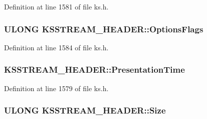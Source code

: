 Definition at line 1581 of file ks.\+h.

\subsubsection[{\texorpdfstring{Options\+Flags}{OptionsFlags}}]{\setlength{\rightskip}{0pt plus 5cm}U\+L\+O\+NG K\+S\+S\+T\+R\+E\+A\+M\+\_\+\+H\+E\+A\+D\+E\+R\+::\+Options\+Flags}\hypertarget{struct_k_s_s_t_r_e_a_m___h_e_a_d_e_r_aa3c01e08df2301bcc31960826d9bf80f}{}\label{struct_k_s_s_t_r_e_a_m___h_e_a_d_e_r_aa3c01e08df2301bcc31960826d9bf80f}


Definition at line 1584 of file ks.\+h.

\subsubsection[{\texorpdfstring{Presentation\+Time}{PresentationTime}}]{ K\+S\+S\+T\+R\+E\+A\+M\+\_\+\+H\+E\+A\+D\+E\+R\+::\+Presentation\+Time}\hypertarget{struct_k_s_s_t_r_e_a_m___h_e_a_d_e_r_a5900b2557203944a2ba94ac03eb6e1f0}{}\label{struct_k_s_s_t_r_e_a_m___h_e_a_d_e_r_a5900b2557203944a2ba94ac03eb6e1f0}


Definition at line 1579 of file ks.\+h.

\subsubsection[{\texorpdfstring{Size}{Size}}]{\setlength{\rightskip}{0pt plus 5cm}U\+L\+O\+NG K\+S\+S\+T\+R\+E\+A\+M\+\_\+\+H\+E\+A\+D\+E\+R\+::\+Size}\hypertarget{struct_k_s_s_t_r_e_a_m___h_e_a_d_e_r_a2763cce2aed94a0c37e6630595e3c86d}{}\label{struct_k_s_s_t_r_e_a_m___h_e_a_d_e_r_a2763cce2aed94a0c37e6630595e3c86d}


